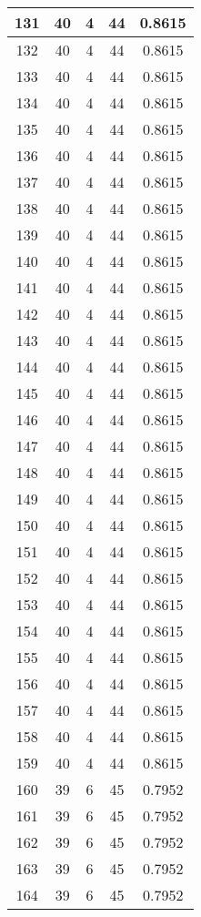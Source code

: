 \documentclass[letterpaper, 12pt]{article}
\begin{document}
\begin{longtable}{|c|c|c|c|c|}
\hline
131 & 40 & 4 & 44 & 0.8615 \\
\hline
132 & 40 & 4 & 44 & 0.8615 \\
\hline
133 & 40 & 4 & 44 & 0.8615 \\
\hline
134 & 40 & 4 & 44 & 0.8615 \\
\hline
135 & 40 & 4 & 44 & 0.8615 \\
\hline
136 & 40 & 4 & 44 & 0.8615 \\
\hline
137 & 40 & 4 & 44 & 0.8615 \\
\hline
138 & 40 & 4 & 44 & 0.8615 \\
\hline
139 & 40 & 4 & 44 & 0.8615 \\
\hline
140 & 40 & 4 & 44 & 0.8615 \\
\hline
141 & 40 & 4 & 44 & 0.8615 \\
\hline
142 & 40 & 4 & 44 & 0.8615 \\
\hline
143 & 40 & 4 & 44 & 0.8615 \\
\hline
144 & 40 & 4 & 44 & 0.8615 \\
\hline
145 & 40 & 4 & 44 & 0.8615 \\
\hline
146 & 40 & 4 & 44 & 0.8615 \\
\hline
147 & 40 & 4 & 44 & 0.8615 \\
\hline
148 & 40 & 4 & 44 & 0.8615 \\
\hline
149 & 40 & 4 & 44 & 0.8615 \\
\hline
150 & 40 & 4 & 44 & 0.8615 \\
\hline
151 & 40 & 4 & 44 & 0.8615 \\
\hline
152 & 40 & 4 & 44 & 0.8615 \\
\hline
153 & 40 & 4 & 44 & 0.8615 \\
\hline
154 & 40 & 4 & 44 & 0.8615 \\
\hline
155 & 40 & 4 & 44 & 0.8615 \\
\hline
156 & 40 & 4 & 44 & 0.8615 \\
\hline
157 & 40 & 4 & 44 & 0.8615 \\
\hline
158 & 40 & 4 & 44 & 0.8615 \\
\hline
159 & 40 & 4 & 44 & 0.8615 \\
\hline
160 & 39 & 6 & 45 & 0.7952 \\
\hline
161 & 39 & 6 & 45 & 0.7952 \\
\hline
162 & 39 & 6 & 45 & 0.7952 \\
\hline
163 & 39 & 6 & 45 & 0.7952 \\
\hline
164 & 39 & 6 & 45 & 0.7952 \\

\end{longtable}
\end{document}
